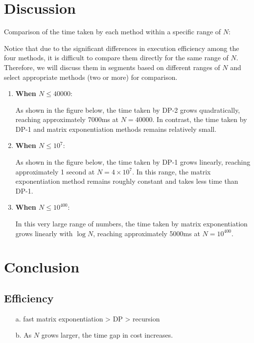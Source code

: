\section{Discussion}
\label{discussion}

Comparison of the time taken by each method within a specific range of $N$:

Notice that due to the significant differences in execution efficiency among the four methods, it is difficult to compare them directly for the same range of $N$. 
Therefore, we will discuss them in segments based on different ranges of $N$ and select appropriate methods (two or more) for comparison.

\begin{enumerate}
    \item \textbf{When $N \leq 40000$}: 
    
    As shown in the figure below, the time taken by DP-2 grows quadratically, reaching approximately 7000ms at \(N=40000\). In contrast, the time taken by DP-1 and matrix exponentiation methods remains relatively small.
    \item \textbf{When $N \leq 10^7$}:
    
    As shown in the figure below, the time taken by DP-1 grows linearly, reaching approximately 1 second at \(N=4 \times 10^7\). In this range, the matrix exponentiation method remains roughly constant and takes less time than DP-1.

    \item \textbf{When $N \leq 10^{400}$}:
    
    In this very large range of numbers, the time taken by matrix exponentiation grows linearly with \( \log N \), reaching approximately 5000ms at \(N = 10^{400}\).
\end{enumerate}

\section{Conclusion}
\label{conclusion}

\subsection{Efficiency}
\begin{enumerate}
    \item [a.] fast matrix exponentiation > DP > recursion
    \item [b.] As $N$ grows larger, the time gap in cost increases. 
\end{enumerate}

